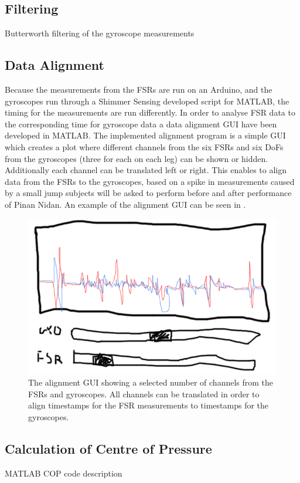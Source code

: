 \subsection{Filtering}
Butterworth filtering of the gyroscope measurements

\subsection{Data Alignment}
Because the measurements from the FSRs are run on an Arduino, and the gyroscopes run through a Shimmer Sensing developed script for MATLAB, the timing for the measurements are run differently. In order to analyse FSR data to the corresponding time for gyroscope data a data alignment GUI have been developed in MATLAB. The implemented alignment program is a simple GUI which creates a plot where different channels from the six FSRs and six DoFs from the gyroscopes (three for each on each leg) can be shown or hidden. Additionally each channel can be translated left or right. This enables to align data from the FSRs to the gyroscopes, based on a spike in measurements caused by a small jump subjects will be asked to perform before and after performance of Pinan Nidan. An example of the alignment GUI can be seen in .

\begin{figure}[H]
	\includegraphics[width=.6\textwidth]{figures/alignGUI}
	\caption{The alignment GUI showing a selected number of channels from the FSRs and gyroscopes. All channels can be translated in order to align timestamps for the FSR measurements to timestamps for the gyroscopes.}
	\label{fig:alignGUI}  %
\end{figure}

\subsection{Calculation of Centre of Pressure}
MATLAB COP code description

